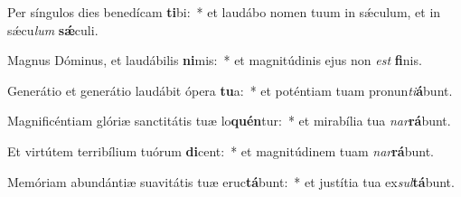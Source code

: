 \item Per síngulos dies benedícam \textbf{ti}bi:~* et laudábo nomen tuum in sǽculum, et in sǽcu\textit{lum} \textbf{sǽ}culi.
\item Magnus Dóminus, et laudábilis \textbf{ni}mis:~* et magnitúdinis ejus non \textit{est} \textbf{fi}nis.
\item Generátio et generátio laudábit ópera \textbf{tu}a:~* et poténtiam tuam pronun\textit{ti}\textbf{á}bunt.
\item Magnificéntiam glóriæ sanctitátis tuæ lo\textbf{quén}tur:~* et mirabília tua \textit{nar}\textbf{rá}bunt.
\item Et virtútem terribílium tuórum \textbf{di}cent:~* et magnitúdinem tuam \textit{nar}\textbf{rá}bunt.
\item Memóriam abundántiæ suavitátis tuæ eruc\textbf{tá}bunt:~* et justítia tua ex\textit{sul}\textbf{tá}bunt.
